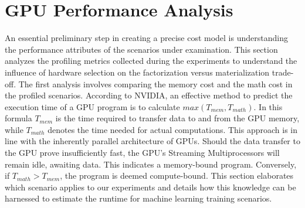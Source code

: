 \section{GPU Performance Analysis}
\label{sec:5-gpu-performance-analysis}
An essential preliminary step in creating a precise cost model is understanding the performance attributes of the scenarios under examination. This section analyzes the profiling metrics collected during the experiments to understand the influence of hardware selection on the factorization versus materialization trade-off. The first analysis involves comparing the memory cost and the math cost in the profiled scenarios. According to NVIDIA, an effective method to predict the execution time of a GPU program is to calculate $max(T_{mem}, T_{math})$. In this formula $T_{mem}$ is the time required to transfer data to and from the GPU memory, while $T_{math}$ denotes the time needed for actual computations. This approach is in line with the inherently parallel architecture of GPUs. Should the data transfer to the GPU prove insufficiently fast, the GPU's Streaming Multiprocessors will remain idle, awaiting data. This indicates a memory-bound program. Conversely, if $T_{math} > T_{mem}$, the program is deemed compute-bound. This section elaborates which scenario applies to our experiments and details how this knowledge can be harnessed to estimate the runtime for machine learning training scenarios.

